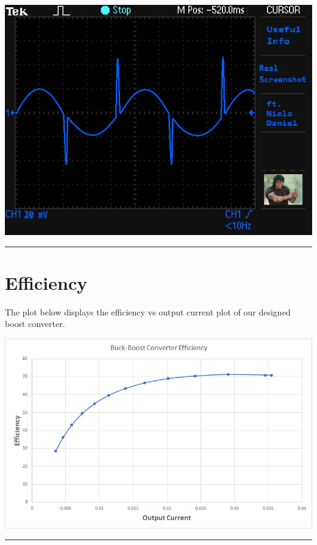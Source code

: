 \documentclass[a4paper,11pt]{article}
\begin{document}
\begin{preview}
        \begin{center}
            \includegraphics[width=1\textwidth]{out.png}
        \end{center}
        
\hrule

    \section{Efficiency}

    The plot below displays the efficiency vs output current plot of our designed boost converter.

        \begin{center}
            \includegraphics[width=1\textwidth]{efficiency.png}
        \end{center}


    \hrule
\end{preview}
\end{document}
